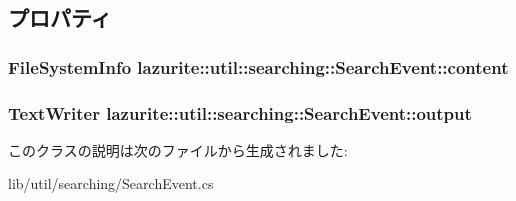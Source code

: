 \subsection{プロパティ}
\hypertarget{classlazurite_1_1util_1_1searching_1_1_search_event_a9ff4ceac01438f89d4556e0af4b9ea3f}{
\subsubsection[{content}]{\setlength{\rightskip}{0pt plus 5cm}FileSystemInfo lazurite::util::searching::SearchEvent::content}}
\label{classlazurite_1_1util_1_1searching_1_1_search_event_a9ff4ceac01438f89d4556e0af4b9ea3f}
\hypertarget{classlazurite_1_1util_1_1searching_1_1_search_event_add285e50dbd066c93d08cf646589608b}{
\subsubsection[{output}]{\setlength{\rightskip}{0pt plus 5cm}TextWriter lazurite::util::searching::SearchEvent::output}}
\label{classlazurite_1_1util_1_1searching_1_1_search_event_add285e50dbd066c93d08cf646589608b}


このクラスの説明は次のファイルから生成されました:\begin{DoxyCompactItemize}
\item 
lib/util/searching/SearchEvent.cs\end{DoxyCompactItemize}
